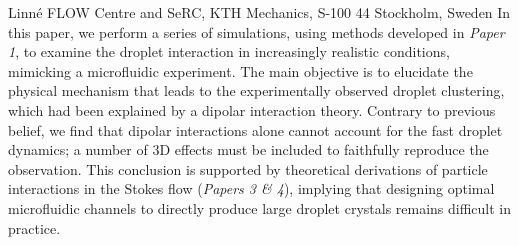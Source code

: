 %
%
%
%
%
%
%
\paperaffiliation
{%
  Linn\'e FLOW Centre and SeRC, KTH Mechanics, S-100 44 Stockholm, Sweden%
}%
%
%
%
%
%
\papernumber{}%
%
%
%
%
%
\papersummary%
{%
In this paper, we perform a series of simulations, using methods developed in \emph{Paper 1},
to examine the droplet interaction in increasingly realistic conditions, mimicking a microfluidic experiment.
The main objective is to elucidate the physical mechanism that leads to the experimentally observed droplet clustering,
which had been explained by a dipolar interaction theory.
Contrary to previous belief, we find that dipolar interactions alone cannot account for the fast droplet dynamics;
a number of 3D effects must be included to faithfully reproduce the observation.
This conclusion is supported by theoretical derivations of particle interactions in the Stokes flow (\emph{Papers 3 \& 4}),
implying that designing optimal microfluidic channels to directly produce large droplet crystals remains difficult in practice.
}%
%
\graphicspath{{paper2/}}%
%
%
%
